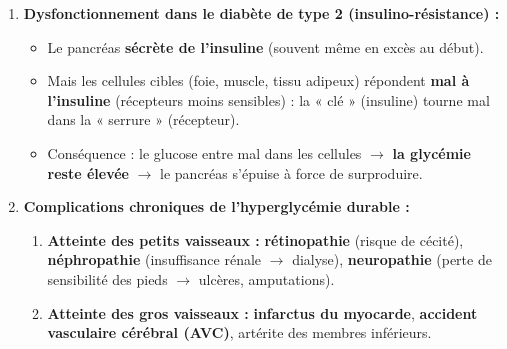 \documentclass[11pt]{article}
\begin{document}
\begin{exoresolu}
\begin{enumerate}
\begin{enumerate}
                \item \textbf{Réponse :} \textbf{glycémie $\downarrow$} vers la valeur normale ($\approx$ 1 g/L).
                \item \textbf{Arrêt :} la baisse de la glycémie arrête la sécrétion d'insuline : c'est la rétroaction négative.
            \end{enumerate}
        \item \textbf{Dysfonctionnement dans le diabète de type 2 (insulino-résistance) :}
            \begin{itemize}
                \item Le pancréas \textbf{sécrète de l'insuline} (souvent même en excès au début).
                \item Mais les cellules cibles (foie, muscle, tissu adipeux) répondent \textbf{mal à l'insuline} (récepteurs moins sensibles) : la « clé » (insuline) tourne mal dans la « serrure » (récepteur).
                \item Conséquence : le glucose entre mal dans les cellules $\rightarrow$ \textbf{la glycémie reste élevée} $\rightarrow$ le pancréas s'épuise à force de surproduire.
            \end{itemize}
        \item \textbf{Complications chroniques de l'hyperglycémie durable :}
            \begin{enumerate}
                \item \textbf{Atteinte des petits vaisseaux :} \textbf{rétinopathie} (risque de cécité), \textbf{néphropathie} (insuffisance rénale $\rightarrow$ dialyse), \textbf{neuropathie} (perte de sensibilité des pieds $\rightarrow$ ulcères, amputations).
                \item \textbf{Atteinte des gros vaisseaux :} \textbf{infarctus du myocarde}, \textbf{accident vasculaire cérébral (AVC)}, artérite des membres inférieurs.
            \end{enumerate}
    \end{enumerate}
\end{exoresolu}
\end{document}
